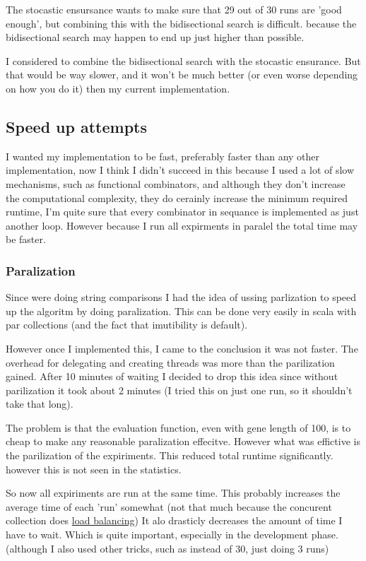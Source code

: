 \documentclass{article}
\begin{document}
\begin{empfile}
The stocastic ensursance wants to make sure that 29 out of 30 runs are
'good enough', but combining this with the bidisectional search is difficult.
because the bidisectional search may happen to end up just higher than possible.

I considered to combine the bidisectional search with the stocastic ensurance.
But that would be way slower, and it won't be much better (or even worse depending
on how you do it) then my current implementation.


\subsection{Speed up attempts}
I wanted my implementation to be fast, preferably faster than any other
implementation, now I think I didn't succeed in this because I used a
lot of slow mechanisms, such as functional combinators, and although
they don't increase the computational complexity, they do cerainly increase
the minimum required runtime, I'm quite sure that every combinator in sequance
is implemented as just another loop. However because I
run all expirments in paralel the total time may be faster.
\subsubsection{Paralization}
Since were doing string comparisons I had the idea of ussing parlization to
speed up the algoritm by doing paralization. This can be done very easily
in scala with par collections (and the fact that imutibility is default).

However once I implemented this, I came to the conclusion it was not faster.
The overhead for delegating and creating threads was more than the parilization
gained.  After 10 minutes of waiting I decided to drop this idea 
since without parilization it took about 2 minutes (I tried this
on just one run, so it shouldn't take that long).

The problem is that the evaluation function, even with gene length of 100, is
to cheap to make any reasonable paralization effecitve. However what was effictive
is the parilization of the expiriments. This reduced total runtime 
significantly. however this is not seen in the statistics.

So now all expiriments are run at the same time. This probably increases the
average time of each 'run' somewhat (not that much because the concurent
collection does \href{http://docs.scala-lang.org/overviews/parallel-collections/configuration.html}{load balancing})
It alo drasticly decreases the amount of time I have to wait. Which is quite
important, especially in the development phase. (although I also used
other tricks, such as instead of 30, just doing 3 runs)


\end{empfile}
\end{document}
